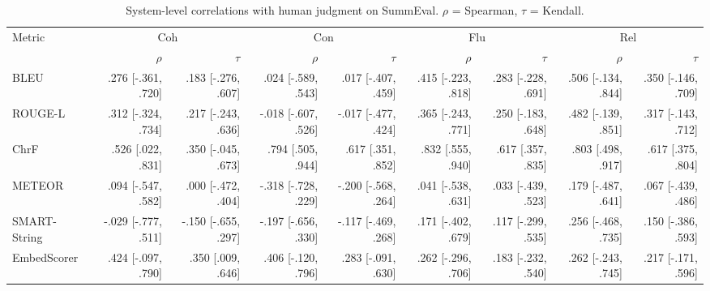 \begin{table}[t]
\centering
\caption{System-level correlations with human judgment on SummEval. $\rho$ = Spearman, $\tau$ = Kendall.}
\label{tab:correlations_system}
\begin{tabular}{lrrrrrrrr}
\toprule
Metric & \multicolumn{2}{c}{Coh} & \multicolumn{2}{c}{Con} & \multicolumn{2}{c}{Flu} & \multicolumn{2}{c}{Rel} \\
\cmidrule(lr){2-3} \cmidrule(lr){4-5} \cmidrule(lr){6-7} \cmidrule(lr){8-9} 
  & $\rho$ & $\tau$ & $\rho$ & $\tau$ & $\rho$ & $\tau$ & $\rho$ & $\tau$ \\
\midrule
BLEU & .276 {\scriptsize [-.361, .720]} & .183 {\scriptsize [-.276, .607]} & .024 {\scriptsize [-.589, .543]} & .017 {\scriptsize [-.407, .459]} & .415 {\scriptsize [-.223, .818]} & .283 {\scriptsize [-.228, .691]} & .506 {\scriptsize [-.134, .844]} & .350 {\scriptsize [-.146, .709]} \\
ROUGE-L & .312 {\scriptsize [-.324, .734]} & .217 {\scriptsize [-.243, .636]} & -.018 {\scriptsize [-.607, .526]} & -.017 {\scriptsize [-.477, .424]} & .365 {\scriptsize [-.243, .771]} & .250 {\scriptsize [-.183, .648]} & .482 {\scriptsize [-.139, .851]} & .317 {\scriptsize [-.143, .712]} \\
ChrF & .526 {\scriptsize [.022, .831]} & .350 {\scriptsize [-.045, .673]} & .794 {\scriptsize [.505, .944]} & .617 {\scriptsize [.351, .852]} & .832 {\scriptsize [.555, .940]} & .617 {\scriptsize [.357, .835]} & .803 {\scriptsize [.498, .917]} & .617 {\scriptsize [.375, .804]} \\
METEOR & .094 {\scriptsize [-.547, .582]} & .000 {\scriptsize [-.472, .404]} & -.318 {\scriptsize [-.728, .229]} & -.200 {\scriptsize [-.568, .264]} & .041 {\scriptsize [-.538, .631]} & .033 {\scriptsize [-.439, .523]} & .179 {\scriptsize [-.487, .641]} & .067 {\scriptsize [-.439, .486]} \\
SMART-String & -.029 {\scriptsize [-.777, .511]} & -.150 {\scriptsize [-.655, .297]} & -.197 {\scriptsize [-.656, .330]} & -.117 {\scriptsize [-.469, .268]} & .171 {\scriptsize [-.402, .679]} & .117 {\scriptsize [-.299, .535]} & .256 {\scriptsize [-.468, .735]} & .150 {\scriptsize [-.386, .593]} \\
EmbedScorer & .424 {\scriptsize [-.097, .790]} & .350 {\scriptsize [.009, .646]} & .406 {\scriptsize [-.120, .796]} & .283 {\scriptsize [-.091, .630]} & .262 {\scriptsize [-.296, .706]} & .183 {\scriptsize [-.232, .540]} & .262 {\scriptsize [-.243, .745]} & .217 {\scriptsize [-.171, .596]} \\

\end{tabular}
\end{table}
